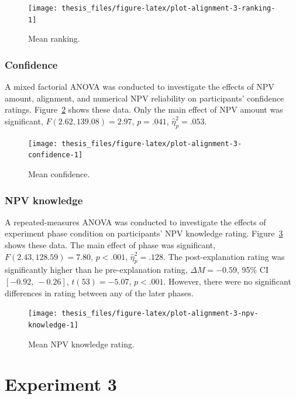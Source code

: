 \documentclass[a4paper, nobind, dvipsnames]{templates/ociamthesis}
\theoremstyle{definition}
\theoremstyle{definition}
\theoremstyle{definition}
\theoremstyle{definition}
\theoremstyle{remark}
\begin{document}
\begin{figure}
\texttt{[image: thesis\_files/figure-latex/plot-alignment-3-ranking-1]} \caption{Mean ranking.}\label{fig:plot-alignment-3-ranking}
\end{figure}

\hypertarget{confidence-1}{%
\subsubsection{Confidence}\label{confidence-1}}

A mixed factorial ANOVA was conducted to investigate the effects of NPV amount,
alignment, and numerical NPV reliability on participants' confidence ratings.
Figure~\ref{fig:plot-alignment-3-confidence} shows these data. Only the main
effect of NPV amount was significant,
\(F(2.62, 139.08) = 2.97\), \(p = .041\), \(\hat{\eta}^2_p = .053\).



\begin{figure}
\texttt{[image: thesis\_files/figure-latex/plot-alignment-3-confidence-1]} \caption{Mean confidence.}\label{fig:plot-alignment-3-confidence}
\end{figure}

\hypertarget{npv-knowledge}{%
\subsubsection{NPV knowledge}\label{npv-knowledge}}

A repeated-measures ANOVA was conducted to investigate the effects of experiment
phase condition on participants' NPV knowledge rating.
Figure~\ref{fig:plot-alignment-3-npv-knowledge} shows these data. The main
effect of phase was significant, \(F(2.43, 128.59) = 7.80\), \(p < .001\), \(\hat{\eta}^2_p = .128\).
The post-explanation rating was significantly higher than he pre-explanation
rating,
\(\Delta M = -0.59\), 95\% CI \([-0.92,~-0.26]\), \(t(53) = -5.07\), \(p < .001\). However, there were no significant
differences in rating between any of the later phases.



\begin{figure}
\texttt{[image: thesis\_files/figure-latex/plot-alignment-3-npv-knowledge-1]} \caption{Mean NPV knowledge rating.}\label{fig:plot-alignment-3-npv-knowledge}
\end{figure}

\hypertarget{alignment-8-appendix}{%
\section{Experiment 3}\label{alignment-8-appendix}}
\end{document}
